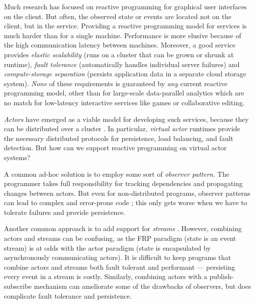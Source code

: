  Much research has focused on reactive programming for graphical user interfaces \cite{elm,flapjax,alive} on the client. But often, the observed state or events are located not on the client, but in the service. Providing a reactive programming model for services is much harder than for a single machine. Performance is more elusive because of the high communication latency between machines. Moreover, a good service provides \emph{elastic scalability} (runs on a cluster that can be grown or shrunk at runtime),  \emph{fault tolerance} (automatically handles individual server failures) and \emph{compute-storage separation} (persists application data in a separate cloud storage system).
\emph{None} of these requirements is guaranteed by \emph{any} current reactive programming model, other than for large-scale data-parallel analytics which are no match for low-latency interactive services like games or collaborative editing.

\emph{Actors} have emerged as a viable model for developing such services, because they can be distributed over a cluster \cite{erlang,akka,orleans}. In particular, \emph{virtual actor} runtimes \cite{orleanstr,orleans,sfactors,orbit} provide the necessary distributed protocols for persistence, load balancing, and fault detection. But how can we support reactive programming on virtual actor systems?
 
A common ad-hoc solution is to employ some sort of \emph{observer pattern}. The programmer takes full responsibility for tracking dependencies and propagating changes between actors. But even for non-distributed programs, observer patterns can lead to complex and error-prone code \cite{sobserver}; this only gets worse when we have to tolerate failures and provide persistence. 

Another common approach is to add support for \emph{streams} \cite{orleans,reactors-io}. However, combining actors and streams can be confusing, as the FRP paradigm (state is an event stream) is at odds with the actor paradigm (state is encapsulated by asynchronously communicating actors). It is difficult to keep programs that combine actors and streams both fault tolerant and performant --- persisting every event in a stream is costly. Similarly, combining actors with a publish-subscribe mechanism \cite{patrick} can ameliorate some of the drawbacks of observers, but does complicate fault tolerance and persistence.

